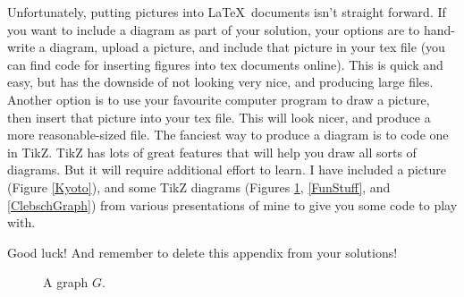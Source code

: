 \documentclass[10pt,a4paper]{article}
\begin{document}
Unfortunately, putting pictures into \LaTeX\ documents isn't straight forward. If you want to include a diagram as part of your solution, your options are to hand-write a diagram, upload a picture, and include that picture in your tex file (you can find code for inserting figures into tex documents online). This is quick and easy, but has the downside of not looking very nice, and producing large files. Another option is to use your favourite computer program to draw a picture, then insert that picture into your tex file. This will look nicer, and produce a more reasonable-sized file. The fanciest way to produce a diagram is to code one in TikZ. TikZ has lots of great features that will help you draw all sorts of diagrams. But it will require additional effort to learn. I have included a picture (Figure \ref{Kyoto}), and some TikZ diagrams (Figures \ref{GraphG}, \ref{FunStuff}, and \ref{ClebschGraph}) from various presentations of mine to give you some code to play with.

Good luck! And remember to delete this appendix from your solutions!

\begin{figure}[h]
\centering
{}
%
\caption{A graph $G$.}\label{GraphG}
\end{figure}
\end{document}

